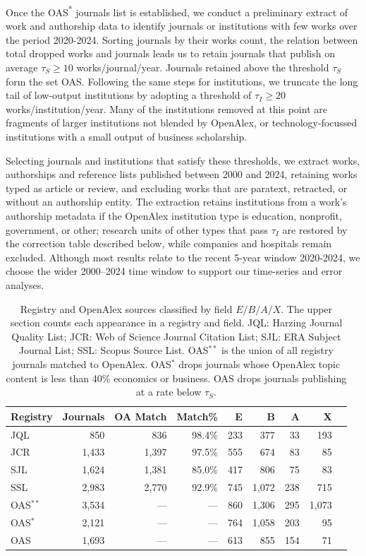 Once the OAS\textsuperscript{*} journals list is established, we conduct a preliminary extract of work and authorship data to identify journals or institutions with few works over the period 2020-2024. Sorting journals by their works count, the relation between total dropped works and journals leads us to retain journals that publish on average $\tau_S \ge 10$ works/journal/year. Journals retained above the threshold $\tau_S$ form the set OAS. Following the same steps for institutions, we truncate the long tail of low-output institutions by adopting a threshold of $\tau_I \ge 20$ works/institution/year. Many of the institutions removed at this point are fragments of larger institutions not blended by OpenAlex, or technology-focussed institutions with a small output of business scholarship. 

Selecting journals and institutions that satisfy these thresholds, we extract works, authorships and reference lists published between 2000 and 2024, retaining works typed as article or review, and excluding works that are paratext, retracted, or without an authorship entity. The extraction retains institutions from a work's authorship metadata if the OpenAlex institution type is education, nonprofit, government, or other; research units of other types that pass $\tau_I$ are restored by the correction table described below, while companies and hospitals remain excluded. Although most results relate to the recent 5-year window 2020-2024, we choose the wider 2000--2024 time window to support our time-series and error analyses.

\begin{table}[!htbp]
\centering
\caption{Registry and OpenAlex sources classified by field $E/B/A/X$. The upper section counts each appearance in a registry and field. JQL: Harzing Journal Quality List; JCR: Web of Science Journal Citation List; SJL: ERA Subject Journal List; SSL: Scopus Source List. OAS$^{**}$ is the union of all registry journals matched to OpenAlex. OAS$^{*}$ drops journals whose OpenAlex topic content is less than 40\% economics or business. OAS drops journals publishing at a rate below $\tau_S$.}
\label{tab:registry_overview}
\begin{tabular}{lrrrrrrrr}
\toprule
Registry & Journals & OA Match & Match\% & E & B & A & X \\
\midrule
JQL & 850 & 836 & 98.4\% & 233 & 377 & 33 & 193 \\
JCR & 1,433 & 1,397 & 97.5\% & 555 & 674 & 83 & 85 \\
SJL & 1,624 & 1,381 & 85.0\% & 417 & 806 & 75 & 83 \\
SSL & 2,983 & 2,770 & 92.9\% & 745 & 1,072 & 238 & 715 \\
\midrule
OAS$^{**}$ & 3,534 & --- & --- & 860 & 1,306 & 295 & 1,073 \\
OAS$^{*}$ & 2,121 & --- & --- & 764 & 1,058 & 203 & 95 \\
OAS & 1,693 & --- & --- & 613 & 855 & 154 & 71 \\
\bottomrule
\end{tabular}
\end{table}

